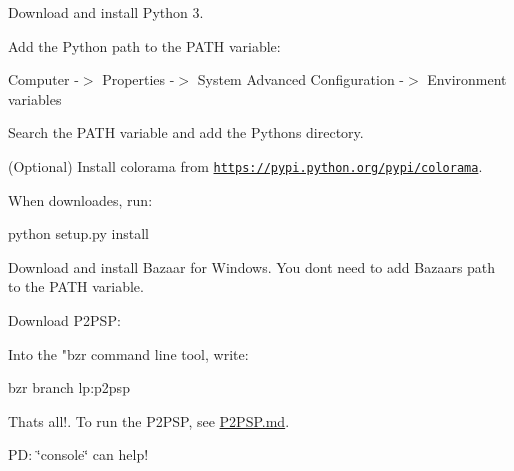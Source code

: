 
\begin{DoxyEnumerate}
\item Download and install Python 3.
\item Add the Python path to the P\+A\+T\+H variable\+:
\end{DoxyEnumerate}

Computer -\/$>$ Properties -\/$>$ System Advanced Configuration -\/$>$ Environment variables

Search the P\+A\+T\+H variable and add the Python\textquotesingle{}s directory.


\begin{DoxyEnumerate}
\item (Optional) Install colorama from \href{https://pypi.python.org/pypi/colorama}{\tt https\+://pypi.\+python.\+org/pypi/colorama}.
\end{DoxyEnumerate}

When downloades, run\+:

python setup.\+py install


\begin{DoxyEnumerate}
\item Download and install Bazaar for Windows. You don\textquotesingle{}t need to add Bazaar\textquotesingle{}s path to the P\+A\+T\+H variable.
\item Download P2\+P\+S\+P\+:
\end{DoxyEnumerate}

Into the "bzr command line tool, write\+:

bzr branch lp\+:p2psp


\begin{DoxyEnumerate}
\item That\textquotesingle{}s all!. To run the P2\+P\+S\+P, see \hyperlink{P2PSP_8md}{P2\+P\+S\+P.\+md}.
\end{DoxyEnumerate}

P\+D\+: \char`\"{}console\char`\"{} can help! 